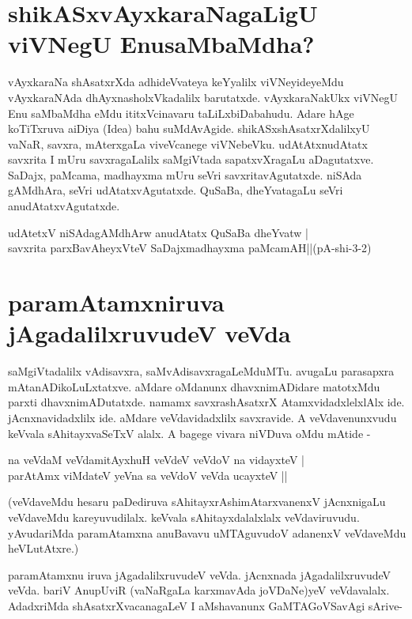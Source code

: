 \section*{shikASxvAyxkaraNagaLigU viVNegU EnusaMbaMdha?}

vAyxkaraNa shAsatxrXda adhideVvateya keYyalilx viVNeyideyeMdu vAyxkaraNAda dhAyxnasholxVkadalilx barutatxde. vAyxkaraNakUkx viVNegU Enu saMbaMdha eMdu ititxVcinavaru taLiLxbiDabahudu. Adare hAge koTiTxruva aiDiya {(\eng Idea)} bahu suMdAvAgide. shikASxshAsatxrXdalilxyU vaNaR, savxra, mAterxgaLa viveVcanege viVNebeVku. udAtAtxnudAtatx savxrita I mUru savxragaLalilx saMgiVtada sapatxvXragaLu aDagutatxve.  SaDajx, paMcama, madhayxma mUru seVri savxritavAgutatxde. niSAda gAMdhAra, seVri udAtatxvAgutatxde. QuSaBa, dheYvatagaLu seVri anudAtatxvAgutatxde.

\begin{shloka}
udAtetxV niSAdagAMdhArw anudAtatx QuSaBa dheYvatw |\label{13}\\
savxrita parxBavAheyxVteV SaDajxmadhayxma paMcamAH||(pA-shi-3-2)
\end{shloka}

\section*{paramAtamxniruva jAgadalilxruvudeV veVda}

saMgiVtadalilx vAdisavxra, saMvAdisavxragaLeMduMTu. avugaLu parasapxra mAtanADikoLuLxtatxve. aMdare oMdanunx dhavxnimADidare matotxMdu parxti dhavxnimADutatxde. namamx savxrashAsatxrX AtamxvidadxlelxlAlx ide. jAcnxnavidadxlilx ide. aMdare veVdavidadxlilx savxravide. A veVdavenunxvudu keVvala sAhitayxvaSeTxV alalx. A bagege vivara niVDuva oMdu mAtide -

\begin{shloka}
na veVdaM veVdamitAyxhuH veVdeV veVdoV na vidayxteV |\label{13c}\\
parAtAmx viMdateV yeVna sa veVdoV veVda ucayxteV ||
\end{shloka}

(veVdaveMdu hesaru paDediruva sAhitayxrAshimAtarxvanenxV jAcnxnigaLu veVdaveMdu kareyuvudilalx. keVvala sAhitayxdalalxlalx  veVdaviruvudu. yAvudariMda paramAtamxna anuBavavu  uMTAguvudoV adanenxV veVdaveMdu heVLutAtxre.)

paramAtamxnu iruva jAgadalilxruvudeV veVda. jAcnxnada jAgadalilxruvudeV veVda. bariV AnupUviR (vaNaRgaLa karxmavAda joVDaNe)yeV veVdavalalx. AdadxriMda shAsatxrXvacanagaLeV I aMshavanunx  GaMTAGoVSavAgi sArive-

